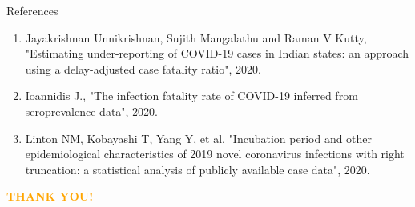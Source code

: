 \documentclass[10pt]{beamer}
\begin{document}
\begin{frame}{References}
\begin{enumerate}
\item  Jayakrishnan Unnikrishnan, Sujith Mangalathu and  Raman V Kutty, "Estimating under-reporting of 
COVID-19 cases in Indian states: an 
approach using a delay-adjusted case 
fatality ratio", 2020.
\item Ioannidis J., "The infection fatality rate of COVID-19 inferred from 
seroprevalence data", 2020.
\item Linton NM, Kobayashi T, Yang Y, et al. "Incubation period and other epidemiological characteristics of 2019 novel coronavirus infections with right truncation: a statistical analysis of publicly available case data", 2020.
\end{enumerate}
\end{frame}
\begin{frame}
   \centering
    \textcolor{orange}{\Huge{\textbf{THANK YOU!}}}
\end{frame}
\end{document}
